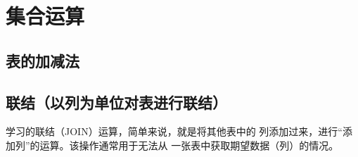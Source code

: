 \chapter{集合运算}
\section{表的加减法}
\section{联结（以列为单位对表进行联结）}
学习的联结（JOIN）运算，简单来说，就是将其他表中的
列添加过来，进行“添加列”的运算。该操作通常用于无法从
一张表中获取期望数据（列）的情况。

